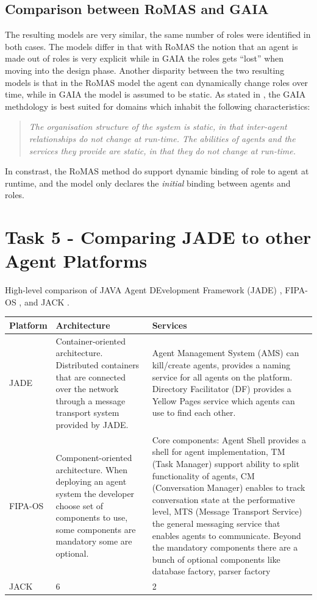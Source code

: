 \documentclass[paper=letter, fontsize=12pt]{article}
\begin{document}
\subsection{Comparison between RoMAS and GAIA}
The resulting models are very similar, the same number of roles were identified in both cases. The models differ in that with RoMAS the notion that an agent is made out of roles is very explicit while in GAIA the roles gets ``lost'' when moving into the design phase. Another disparity between the two resulting models is that in the RoMAS model the agent can dynamically change roles over time, while in GAIA the model is assumed to be static. As stated in \citep{wooldrigde_jennings}, the GAIA methdology is best suited for domains which inhabit the following characteristics:
\begin{quote}
\textit{The organisation structure of the system is static, in that inter-agent relationships do not change at run-time. The abilities of agents and the services they provide are static, in that they do not change at run-time.}\citep{wooldrigde_jennings}
\end{quote}
In constrast, the RoMAS method do support dynamic binding of role to agent at runtime, and the model only declares the \textit{initial} binding between agents and roles.
\section{Task 5 - Comparing JADE to other Agent Platforms}
High-level comparison of JAVA Agent DEvelopment Framework (JADE) \citep{jade}, FIPA-OS \citep{fipaos}, and JACK \citep{jack}.


\begin{tabular}{|p{2cm} p{6cm} p{6cm}|}
\hline
\textbf{Platform}  & \textbf{Architecture} & \textbf{Services} \\
\hline
JADE & Container-oriented architecture. Distributed containers that are connected over the network through a message transport system provided by JADE.& Agent Management System (AMS) can kill/create agents, provides a naming service for all agents on the platform. Directory Facilitator (DF) provides a Yellow Pages service which agents can use to find each other.  \\
\hline
FIPA-OS & Component-oriented architecture. When deploying an agent system the developer choose set of components to use, some components are mandatory some are optional. \citep{fipa-os-2}& Core components: Agent Shell provides a shell for agent implementation, TM (Task Manager) support ability to split functionality of agents, CM (Conversation Manager) enables to track conversation state at the performative level, MTS (Message Transport Service) the general messaging service that enables agents to communicate. Beyond the mandatory components there are a bunch of optional components like database factory, parser factory \citep{fipa-os-2}\\
\hline
JACK    & 6 & 2 \\
\hline
\end{tabular}

{}

\end{document}
